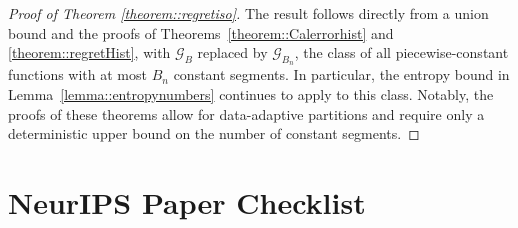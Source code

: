 \documentclass{article}
\theoremstyle{plain}
\theoremstyle{definition}
\theoremstyle{remark}
\begin{document}
 \begin{proof}[Proof of Theorem \ref{theorem::regretiso}]
The result follows directly from a union bound and the proofs of
Theorems~\ref{theorem::Calerrorhist} and \ref{theorem::regretHist}, with
$\mathcal G_B$ replaced by $\mathcal G_{B_n}$, the class of all
piecewise-constant functions with at most $B_n$ constant segments. In
particular, the entropy bound in Lemma~\ref{lemma::entropynumbers} continues to
apply to this class. Notably, the proofs of these theorems allow for
data-adaptive partitions and require only a deterministic upper bound on the
number of constant segments.
\end{proof}
 

\clearpage

\section*{NeurIPS Paper Checklist}
\end{document}
